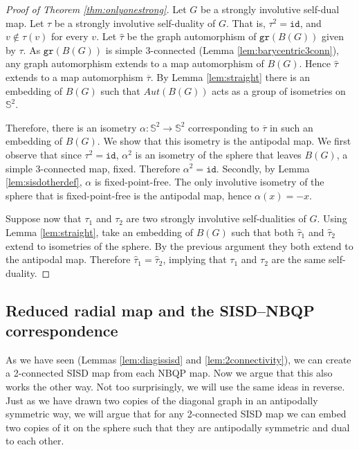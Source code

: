 \documentclass[10pt,a4paper]{article}
\newcommand{\Sb}[0]{\mathbb{S}}
\newcommand{\gr}{\mathtt{gr}}
\newcommand{\id}{\mathtt{id}}
\begin{document}
\begin{proof}[Proof of Theorem \ref{thm:onlyonestrong}]

Let $G$ be a strongly involutive self-dual map. Let $\tau$ be a strongly involutive self-duality of $G$. That is, $\tau^2=\id$, and $v\notin\tau(v)$ for every $v$. Let $\widehat{\tau}$ be the graph automorphism of $\gr(B(G))$ given by $\tau$. As $\gr(B(G))$ is simple 3-connected (Lemma \ref{lem:barycentric3conn}), any graph automorphism extends to a map automorphism of $B(G)$. Hence $\widehat{\tau}$ extends to a map automorphism $\overline{\tau}$. By Lemma \ref{lem:straight} there is an embedding of $B(G)$ such that $Aut(B(G))$ acts as a group of isometries on $\Sb^2$.

Therefore, there is an isometry $\alpha: \Sb^2\rightarrow \Sb^2$ corresponding to $\overline{\tau}$ in such an embedding of $B(G)$. We show that this isometry is  the antipodal map.  We first observe that since $\tau^2=\id$, $\alpha^2$ is an isometry of the sphere that leaves $B(G)$, a simple 3-connected map, fixed. Therefore $\alpha^2=\id$. Secondly, by Lemma \ref{lem:sisdotherdef}, $\alpha$ is fixed-point-free. The only involutive isometry of the sphere that is fixed-point-free is the antipodal map, hence $\alpha(x)=-x$.

Suppose now that $\tau_1$ and $\tau_2$ are two strongly involutive self-dualities of $G$. Using Lemma \ref{lem:straight}, take an embedding of $B(G)$ such that both $\widehat{\tau}_1$ and $\widehat{\tau}_2$ extend to isometries of the sphere. By the previous argument they both extend to the antipodal map. Therefore $\widehat{\tau}_1=\widehat{\tau}_2$, implying that $\tau_1$ and $\tau_2$  are the same self-duality.


\end{proof}



\subsection{Reduced radial map and the SISD--NBQP correspondence}




As we have seen (Lemmas \ref{lem:diagissisd} and \ref{lem:2connectivity}), we can create a 2-connected SISD map from each NBQP map. Now we argue that this also works the other way. Not too surprisingly, we will use the same ideas in reverse. Just as we have drawn two copies of the diagonal graph in an antipodally symmetric way, we will argue that for any 2-connected SISD map we can embed two copies of it on the sphere such that they are antipodally symmetric and dual to each other. 
\end{document}
